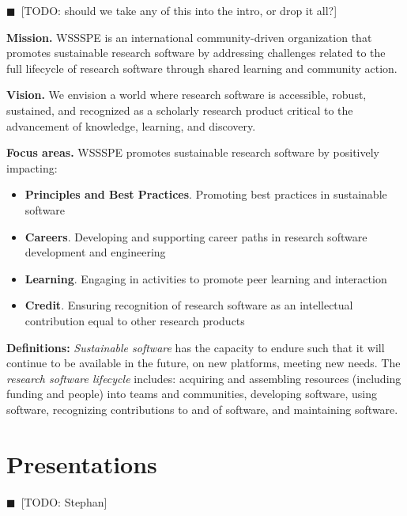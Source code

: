 \documentclass[11pt, oneside]{amsart}
\newcommand{\todo}[1]{{\color{blue}$\blacksquare$~\textsf{[TODO: #1]}}}
\begin{document}
\todo{should we take any of this into the intro, or drop it all?}


 {\bf Mission.}
 WSSSPE is an international community-driven organization that promotes sustainable research software by addressing challenges related to the full lifecycle of research software through shared learning and community action.

 {\bf Vision.}
 We envision a world where research software is accessible, robust, sustained, and recognized as a scholarly research product critical to the advancement of knowledge, learning, and discovery.

 {\bf Focus areas.}
 WSSSPE promotes sustainable research software by positively impacting:
 \begin{itemize}
 \item {\bf Principles and Best Practices}. Promoting best practices in sustainable software
 \item {\bf Careers}. Developing and supporting career paths in research software development and engineering
 \item {\bf Learning}. Engaging in activities to promote peer learning and interaction
 \item {\bf Credit}. Ensuring recognition of research software as an intellectual contribution equal to other research products
 \end{itemize}

 \textbf{Definitions:}
 \emph{Sustainable software} has the capacity to endure such that it will continue to
 be available in the future, on new platforms, meeting new needs.
 The \emph{research software lifecycle} includes:
 acquiring and assembling resources (including funding and people) into teams and communities,
 developing software,
 using software,
 recognizing contributions to and of software,
 and
 maintaining software.


\section{Presentations}\label{sec:presentations}

\todo{Stephan}
\end{document}
